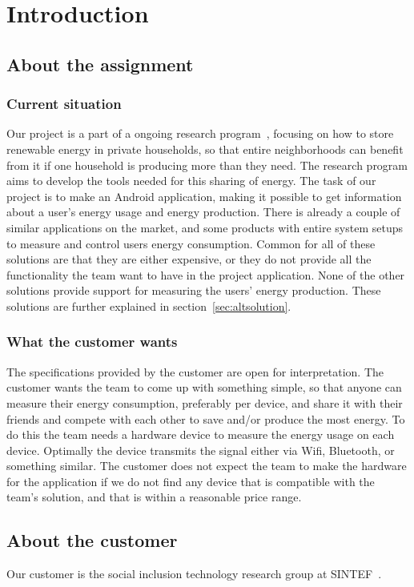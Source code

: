 \chapter{Introduction}

\section{About the assignment}
\subsection{Current situation}
Our project is a part of a ongoing research program~\cite{cossmic}, focusing on how to store renewable energy in private households, so that entire neighborhoods can benefit from it if one household is producing more than they need. The research program aims to develop the tools needed for this sharing of energy. The task of our project is to make an Android application, making it possible to get information about a user's energy usage and energy production. There is already a couple of similar applications on the market, and some products with entire system setups to measure and control users energy consumption. Common for all of these solutions are that they are either expensive, or they do not provide all the functionality the team want to have in the project application. None of the other solutions provide support for measuring the users' energy production. These solutions are further explained in section~\ref{sec:altsolution}.

\subsection{What the customer wants}
The specifications provided by the customer are open for interpretation. The customer wants the team to come up with something simple, so that anyone can measure their energy consumption, preferably per device, and share it with their friends and compete with each other to save and/or produce the most energy. To do this the team needs a hardware device to measure the energy usage on each device. Optimally the device transmits the signal either via Wifi, Bluetooth, or something similar. The customer does not expect the team to make the hardware for the application if we do not find any device that is compatible with the team's solution, and that is within a reasonable price range.

\section{About the customer}

Our customer is the social inclusion technology research group at SINTEF~\cite{sintef}.








 


